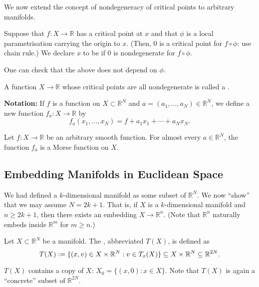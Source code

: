 We now extend the concept of nondegeneracy of critical points to arbitrary manifolds.

\begin{defn}
	Suppose that $f : X \to \mathbb{R}$ has a critical point at $x$ and that $\phi$ is a local parametrisation carrying the origin to $x$. (Then, $0$ is a critical point for $f \circ \phi$: use chain rule.) \newline
	We declare $x$ to be  if $0$ is nondegenerate for $f \circ \phi$.
\end{defn}

One can check that the above does not depend on $\phi$.

\begin{defn}
	A function $X \to \mathbb{R}$ whose critical points are all nondegenerate is called a .
\end{defn}

\textbf{Notation:} If $f$ is a function on $X \subset \mathbb{R}^{N}$ and $a = (a_{1}, \ldots, a_{N}) \in \mathbb{R}^{N}$, we define a new function $f_{a} : X \to \mathbb{R}$ by
\begin{equation*} 
	f_{a}(x_{1}, \ldots, x_{N}) = f + a_{1} x_{1} + \cdots + a_{N} x_{N}.
\end{equation*}

\begin{thm}
	Let $f : X \to \mathbb{R}$ be an arbitrary smooth function. For almost every $a \in \mathbb{R}^{N}$, the function $f_{a}$ is a Morse function on $X$.
\end{thm}

\subsection{Embedding Manifolds in Euclidean Space}

We had defined a $k$-dimensional manifold as some subset of $\mathbb{R}^{N}$. We now ``show'' that we may assume $N = 2k + 1$. That is, if $X$ is a $k$-dimensional manifold and $n \ge 2k + 1$, then there exists an embedding $X \to \mathbb{R}^{n}$. (Note that $\mathbb{R}^{n}$ naturally embeds inside $\mathbb{R}^{m}$ for $m \ge n$.)

\begin{defn}
	Let $X \subset \mathbb{R}^{N}$ be a manifold. The , abbreviated $T(X)$, is defined as
	\begin{equation*} 
		T(X) \vcentcolon= \{(x, v) \in X \times \mathbb{R}^{N} : v \in T_{x}(X)\} \subset X \times \mathbb{R}^{N} \subset \mathbb{R}^{2N}.
	\end{equation*}
\end{defn}
$T(X)$ contains a copy of $X$: $X_{0} = \{(x, 0) : x \in X\}$. Note that $T(X)$ is again a ``concrete'' subset of $\mathbb{R}^{2N}$.

